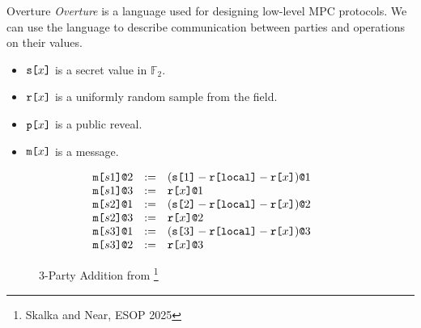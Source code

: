 \documentclass{beamer}
\begin{document}
\begin{frame}{Overture}
    \textit{Overture} is a language used for designing low-level MPC protocols. We can use the language to describe communication between parties and operations on their values.
    \begin{itemize}
    \item $\texttt{s[}x\texttt{]}$ is a secret value in $\mathbb{F}_2$.
    \item $\texttt{r[}x\texttt{]}$ is a uniformly random sample from the field.
    \item $\texttt{p[}x\texttt{]}$ is a public reveal.
    \item $\texttt{m[}x\texttt{]}$ is a message.
    \end{itemize}
\begin{figure}
    {\footnotesize
    $$
    \begin{array}{c@{\qquad}c}
    \begin{array}{llllll}
      \elab{\mesg{s1}}{2} &:=& \elab{(\secret{1} \fminus \locflip \fminus \flip{x})}{1} \\ 
      \elab{\mesg{s1}}{3} &:=& \elab{\flip{x}}{1} \\ 
      \elab{\mesg{s2}}{1} &:=& \elab{(\secret{2} \fminus \locflip \fminus \flip{x})}{2} \\ 
      \elab{\mesg{s2}}{3} &:=& \elab{\flip{x}}{2} \\ 
      \elab{\mesg{s3}}{1} &:=& \elab{(\secret{3} \fminus \locflip \fminus \flip{x})}{3} \\ 
      \elab{\mesg{s3}}{2} &:=& \elab{\flip{x}}{3} \\
    \end{array}
    \end{array}$$
    }
    \caption{3-Party Addition from \footnote{Skalka and Near, ESOP 2025}}
    \label{fig-3-party-add}
    \end{figure}
\end{frame}
\end{document}
